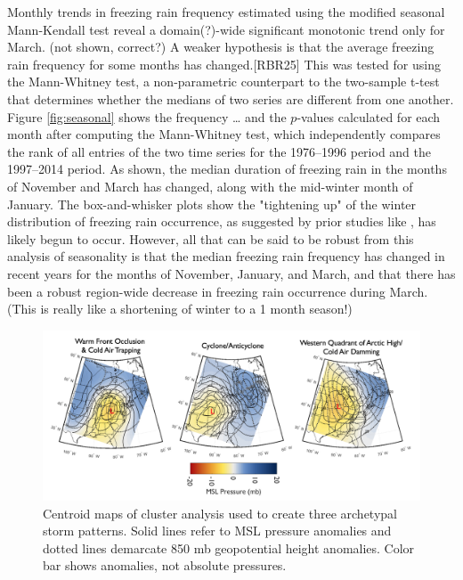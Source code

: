 \documentclass[twocol]{ametsoc}
\begin{document}
Monthly trends in freezing rain frequency estimated using the modified seasonal Mann-Kendall test reveal a domain(?)-wide significant monotonic trend only for March. (not shown, correct?) A weaker hypothesis is that the average freezing rain frequency for some months has changed.[RBR25] This was tested for using the Mann-Whitney test, a non-parametric counterpart to the two-sample t-test that determines whether the medians of two series are different from one another. Figure \ref{fig:seasonal} shows the frequency … and the $p$-values calculated for each month after computing the Mann-Whitney test, which independently compares the rank of all entries of the two time series for the 1976--1996 period and the 1997--2014 period. As shown, the median duration of freezing rain in the months of November and March has changed, along with the mid-winter month of January. The box-and-whisker plots show the "tightening up" of the winter distribution of freezing rain occurrence, as suggested by prior studies like \citet{cheng2011possible}, has likely begun to occur. However, all that can be said to be robust from this analysis of seasonality is that the median freezing rain frequency has changed in recent years for the months of November, January, and March, and that there has been a robust region-wide decrease in freezing rain occurrence during March. (This is really like a shortening of winter to a 1 month season!)



\begin{figure}

\centering

\includegraphics[width=1\textwidth]{Cluster_Centroids.png}

\caption{\label{fig:centroids} Centroid maps of cluster analysis  used to create three archetypal storm patterns. Solid lines refer to MSL pressure anomalies and dotted lines demarcate 850 mb geopotential height anomalies. Color bar shows anomalies, not absolute pressures.}

\end{figure}
\end{document}
